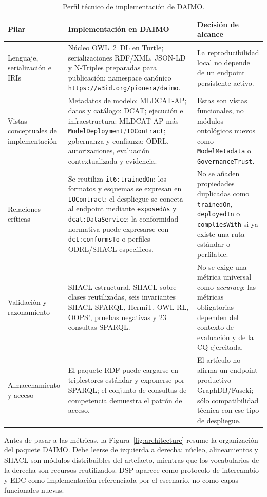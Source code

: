 \documentclass[Afour,sagev,times]{sagej}
\newcommand{\code}[1]{\texttt{#1}}
\begin{document}
\begin{table}[tb]
\scriptsize\sf\centering
\caption{Perfil técnico de implementación de DAIMO.\label{tab:implementation-profile}}
\begin{tabular}{@{}p{3.0cm}p{7.0cm}p{4.8cm}@{}}
\toprule
\textbf{Pilar} & \textbf{Implementación en DAIMO} & \textbf{Decisión de alcance} \\
\midrule
Lenguaje, serialización e IRIs & Núcleo OWL~2~DL en Turtle; serializaciones RDF/XML, JSON-LD y N-Triples preparadas para publicación; namespace canónico \code{https://w3id.org/pionera/daimo}. & La reproducibilidad local no depende de un endpoint persistente activo. \\
Vistas conceptuales de implementación & Metadatos de modelo: MLDCAT-AP; datos y catálogo: DCAT; ejecución e infraestructura: MLDCAT-AP más \code{ModelDeployment}/\code{IOContract}; gobernanza y confianza: ODRL, autorizaciones, evaluación contextualizada y evidencia. & Estas son vistas funcionales, no módulos ontológicos nuevos como \code{ModelMetadata} o \code{GovernanceTrust}. \\
Relaciones críticas & Se reutiliza \code{it6:trainedOn}; los formatos y esquemas se expresan en \code{IOContract}; el despliegue se conecta al endpoint mediante \code{exposedAs} y \code{dcat:DataService}; la conformidad normativa puede expresarse con \code{dct:conformsTo} o perfiles ODRL/SHACL específicos. & No se añaden propiedades duplicadas como \code{trainedOn}, \code{deployedIn} o \code{compliesWith} si ya existe una ruta estándar o perfilable. \\
Validación y razonamiento & SHACL estructural, SHACL sobre clases reutilizadas, seis invariantes SHACL-SPARQL, HermiT, OWL-RL, OOPS!, pruebas negativas y 23 consultas SPARQL. & No se exige una métrica universal como \emph{accuracy}; las métricas obligatorias dependen del contexto de evaluación y de la CQ ejercitada. \\
Almacenamiento y acceso & El paquete RDF puede cargarse en triplestores estándar y exponerse por SPARQL; el conjunto de consultas de competencia demuestra el patrón de acceso. & El artículo no afirma un endpoint productivo GraphDB/Fuseki; sólo compatibilidad técnica con ese tipo de despliegue. \\
\bottomrule
\end{tabular}
\end{table}

Antes de pasar a las métricas, la Figura~\ref{fig:architecture} resume la organización del paquete DAIMO. Debe leerse de izquierda a derecha: núcleo, alineamientos y SHACL son módulos distribuibles del artefacto, mientras que los vocabularios de la derecha son recursos reutilizados. DSP aparece como protocolo de intercambio y EDC como implementación referenciada por el escenario, no como capas funcionales nuevas.
\end{document}
